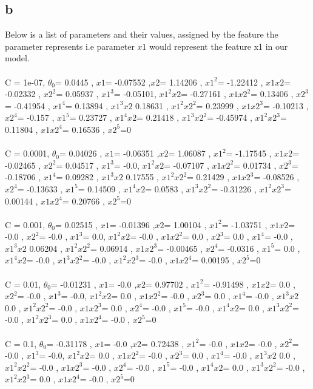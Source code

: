 \documentclass[11pt]{article} %
\begin{document}
\subsection{b}
Below is a list of parameters and their values, assigned by the feature the parameter represents i.e parameter  \(x1\) would represent the feature x1 in our model.
\\\\
C = 1e-07, \(\theta_0\)= 0.0445 , \(x1\)= -0.07552 ,\(x2\)= 1.14206 , \(x1^2\)= -1.22412 , \(x1 x2\)= -0.02332 , \(x2^2\)= 0.05937 , \(x1^3\)= -0.05101, \(x1^2 x2\)= -0.27161 , \(x1 x2^2\)= 0.13406 , \(x2^3\)= -0.41954 , \(x1^4\)= 0.13894 , \(x1^3 x2\) 0.18631 , \(x1^2 x2^2\)= 0.23999 , \(x1 x2^3\)= -0.10213 , \(x2^4\)= -0.157 , \(x1^5\)= 0.23727 , \(x1^4 x2\)= 0.21418 , \(x1^3 x2^2\)= -0.45974 , \(x1^2 x2^3\)= 0.11804 , \(x1 x2^4\)= 0.16536 , \(x2^5\)=0 \\\\
 C = 0.0001, \(\theta_0\)= 0.04026 , \(x1\)= -0.06351 ,\(x2\)= 1.06087 , \(x1^2\)= -1.17545 , \(x1 x2\)= -0.02465 , \(x2^2\)= 0.04517 , \(x1^3\)= -0.0, \(x1^2 x2\)= -0.07107 , \(x1 x2^2\)= 0.01734 , \(x2^3\)= -0.18706 , \(x1^4\)= 0.09282 , \(x1^3 x2\) 0.17555 , \(x1^2 x2^2\)= 0.21429 , \(x1 x2^3\)= -0.08526 , \(x2^4\)= -0.13633 , \(x1^5\)= 0.14509 , \(x1^4 x2\)= 0.0583 , \(x1^3 x2^2\)= -0.31226 , \(x1^2 x2^3\)= 0.00144 , \(x1 x2^4\)= 0.20766 , \(x2^5\)=0 \\\\
 C = 0.001, \(\theta_0\)= 0.02515 , \(x1\)= -0.01396 ,\(x2\)= 1.00104 , \(x1^2\)= -1.03751 , \(x1 x2\)= -0.0 , \(x2^2\)= -0.0 , \(x1^3\)= 0.0, \(x1^2 x2\)= -0.0 , \(x1 x2^2\)= 0.0 , \(x2^3\)= 0.0 , \(x1^4\)= -0.0 , \(x1^3 x2\) 0.06204 , \(x1^2 x2^2\)= 0.06914 , \(x1 x2^3\)= -0.00465 , \(x2^4\)= -0.0316 , \(x1^5\)= 0.0 , \(x1^4 x2\)= -0.0 , \(x1^3 x2^2\)= -0.0 , \(x1^2 x2^3\)= -0.0 , \(x1 x2^4\)= 0.00195 , \(x2^5\)=0 \\\\
 C = 0.01, \(\theta_0\)= -0.01231 , \(x1\)= -0.0 ,\(x2\)= 0.97702 , \(x1^2\)= -0.91498 , \(x1 x2\)= 0.0 , \(x2^2\)= -0.0 , \(x1^3\)= -0.0, \(x1^2 x2\)= 0.0 , \(x1 x2^2\)= -0.0 , \(x2^3\)= 0.0 , \(x1^4\)= -0.0 , \(x1^3 x2\) 0.0 , \(x1^2 x2^2\)= -0.0 , \(x1 x2^3\)= 0.0 , \(x2^4\)= -0.0 , \(x1^5\)= -0.0 , \(x1^4 x2\)= 0.0 , \(x1^3 x2^2\)= -0.0 , \(x1^2 x2^3\)= 0.0 , \(x1 x2^4\)= -0.0 , \(x2^5\)=0 \\\\
 C = 0.1, \(\theta_0\)= -0.31178 , \(x1\)= -0.0 ,\(x2\)= 0.72438 , \(x1^2\)= -0.0 , \(x1 x2\)= -0.0 , \(x2^2\)= -0.0 , \(x1^3\)= -0.0, \(x1^2 x2\)= 0.0 , \(x1 x2^2\)= -0.0 , \(x2^3\)= 0.0 , \(x1^4\)= -0.0 , \(x1^3 x2\) 0.0 , \(x1^2 x2^2\)= -0.0 , \(x1 x2^3\)= -0.0 , \(x2^4\)= -0.0 , \(x1^5\)= -0.0 , \(x1^4 x2\)= 0.0 , \(x1^3 x2^2\)= -0.0 , \(x1^2 x2^3\)= 0.0 , \(x1 x2^4\)= -0.0 , \(x2^5\)=0 \\\\
\end{document}

